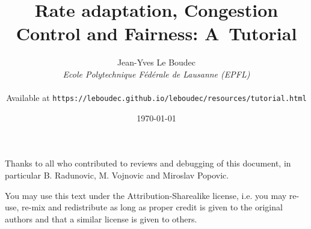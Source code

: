 \documentclass[12pt,twoside,onecolumn,a4paper]{book}
\begin{document}
\graphicspath{{C:/cvs files/exosSourceFiles/exoFigures/}}
\title{
\maketline Rate adaptation, Congestion Control and Fairness: A~Tutorial \maketline }
\author{ {\sc Jean-Yves Le Boudec}  \\ {\em Ecole Polytechnique F\'{e}d\'{e}rale de Lausanne (EPFL)} \\ ~\\
{\small Available at \texttt{https://leboudec.github.io/leboudec/resources/tutorial.html}}
\date{\today}
}\maketitle

\newpage
Thanks to all who contributed to reviews and debugging of this document, in particular B. Radunovic, M. Vojnovic and Miroslav Popovic.

You may use this text under the Attribution-Sharealike license, i.e. you may re-use, re-mix and redistribute as long as proper credit is given to the original authors and that a similar license is given to others.

\tableofcontents


\appendix


\end{document}
